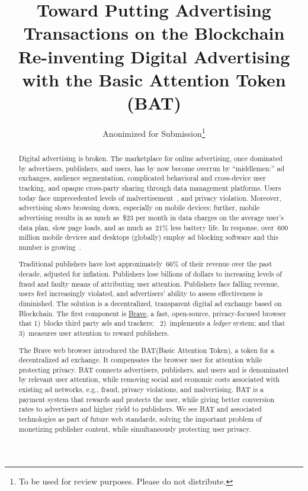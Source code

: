 \documentclass[twocolumn,9pt]{article}
\newcommand{\bat}{\textsf{BAT}\xspace}
\begin{document}
\sloppy
\title{%
Toward Putting Advertising Transactions on the Blockchain\\[1mm] 
\normalsize \bf Re-inventing Digital Advertising with the Basic Attention Token (\bat) }
\author{Anonimized for Submission\footnote{To be used for review purposes. Please do not distribute.}}
\date{}
\maketitle

\begin{abstract}
Digital advertising is broken. The marketplace for online advertising, once dominated by advertisers, publishers, and users, has by now become overrun by ``middlemen:'' ad exchanges, audience segmentation, complicated behavioral and cross-device user tracking, and opaque cross-party sharing through data management platforms. 
Users today face unprecedented levels of malvertisement~\cite{malvertising}, and privacy violation. 
Moreover, advertising slows browsing down, especially on mobile devices; further, mobile advertising results in as much as~\$23 per month in data charges on the average user's data plan, slow page loads, and as much as~21\% less battery life.  
In response, over~600 million mobile devices and desktops (globally) employ ad blocking software and this number is growing~\cite{blocking,blocks-ads}. 

Traditional publishers have lost approximately~66\% of their revenue over the past decade, adjusted for inflation. 
Publishers lose billions of dollars to increasing levels of fraud and faulty means of attributing user attention. 
Publishers face falling revenue, users feel increasingly violated, and advertisers' ability to assess effectiveness is diminished. 
The solution is a decentralized, transparent digital ad exchange based on Blockchain. 
The first component is \href{https://www.brave.com}{Brave}, a fast, open-source, privacy-focused browser that 1)~blocks third party ads and trackers; ~2)~implements a \emph{ledger} system; and that 3)~measures user attention to reward publishers. 

The Brave web browser introduced the \bat (Basic Attention Token), a token for a decentralized ad exchange. It compensates the browser user for attention while protecting privacy.
\bat connects advertisers, publishers, and users and is denominated by relevant user attention, while removing social and economic costs associated with existing ad networks, e.g., fraud, privacy violations, and malvertising.
\bat is a payment system that rewards and protects the user, while giving better conversion rates to advertisers and higher yield to publishers.
We see \bat and associated technologies as part of future web standards, solving the important problem of monetizing publisher content, while simultaneously protecting user privacy. 

\end{abstract}
\end{document}
